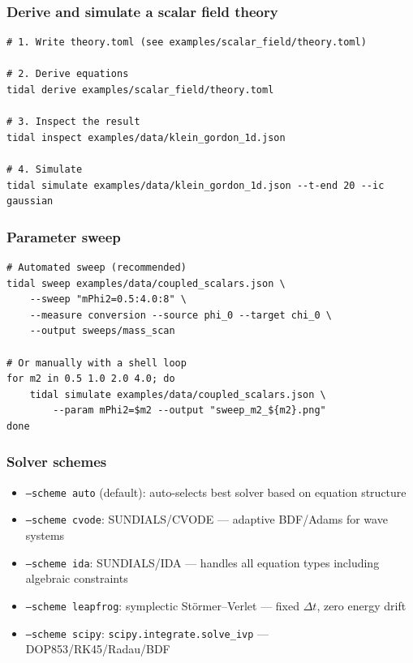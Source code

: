 \subsubsection{Derive and simulate a scalar field theory}

\begin{lstlisting}[style=bash]
# 1. Write theory.toml (see examples/scalar_field/theory.toml)

# 2. Derive equations
tidal derive examples/scalar_field/theory.toml

# 3. Inspect the result
tidal inspect examples/data/klein_gordon_1d.json

# 4. Simulate
tidal simulate examples/data/klein_gordon_1d.json --t-end 20 --ic gaussian
\end{lstlisting}

\subsubsection{Parameter sweep}

\begin{lstlisting}[style=bash]
# Automated sweep (recommended)
tidal sweep examples/data/coupled_scalars.json \
    --sweep "mPhi2=0.5:4.0:8" \
    --measure conversion --source phi_0 --target chi_0 \
    --output sweeps/mass_scan

# Or manually with a shell loop
for m2 in 0.5 1.0 2.0 4.0; do
    tidal simulate examples/data/coupled_scalars.json \
        --param mPhi2=$m2 --output "sweep_m2_${m2}.png"
done
\end{lstlisting}

\subsubsection{Solver schemes}

\begin{itemize}
  \item \texttt{--scheme auto} (default): auto-selects best solver based on equation structure
  \item \texttt{--scheme cvode}: SUNDIALS/CVODE --- adaptive BDF/Adams for wave systems
  \item \texttt{--scheme ida}: SUNDIALS/IDA --- handles all equation types including algebraic constraints
  \item \texttt{--scheme leapfrog}: symplectic St\"ormer--Verlet --- fixed $\Delta t$, zero energy drift
  \item \texttt{--scheme scipy}: \texttt{scipy.integrate.solve\_ivp} --- DOP853/RK45/Radau/BDF
\end{itemize}

